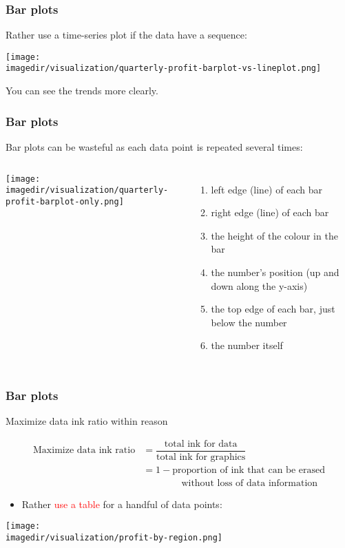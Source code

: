 \begin{frame}\frametitle{Bar plots}
	
	Rather use a time-series plot if the data have a sequence: 
	\begin{center}
		\texttt{[image: \\imagedir/visualization/quarterly-profit-barplot-vs-lineplot.png]}
	\end{center}
	You can see the trends more clearly.
\end{frame}

\begin{frame}\frametitle{Bar plots}
	
	Bar plots can be wasteful as each data point is repeated several times:
	\begin{columns}
		\column{6cm} 
			\begin{center}
				\texttt{[image: \\imagedir/visualization/quarterly-profit-barplot-only.png]} 
			\end{center}
		\column{4cm} 
			\begin{enumerate}
				\item	left edge (line) of each bar 
				\item	right edge (line) of each bar 
				\item	the height of the colour in the bar 
				\item	the number's position (up and down along the y-axis) 
				\item	the top edge of each bar, just below the number 
				\item	the number itself 
			\end{enumerate}
	\end{columns}
\end{frame}

\begin{frame}\frametitle{Bar plots}
	\begin{exampleblock}{Maximize data ink ratio within reason}
		\begin{center}
			\[
				\begin{array}{rl}
					\text{Maximize data ink ratio} 	&= \dfrac{\text{total ink for data}}{{\text{total ink for graphics}}} \\
													&= 1 - \text{proportion of ink that can be erased} \\
													&\qquad\qquad \text{without loss of data information} 
			\end{array}
			\]
		\end{center}
	\end{exampleblock}
	\begin{itemize}
		\item	Rather \textcolor{red}{use a table} for a handful of data points: 
	\end{itemize}
	\begin{center}
		\texttt{[image: \\imagedir/visualization/profit-by-region.png]}
	\end{center}
\end{frame}

